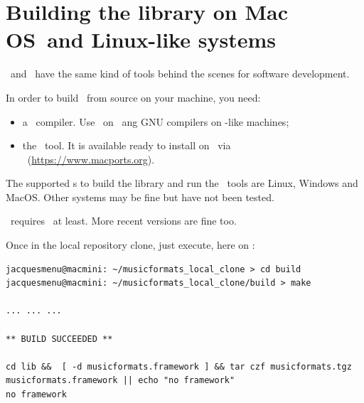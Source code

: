 \section{Building the library on Mac OS\texttrademark\ and Linux-like systems}

\MacOS\ and \Linux\ have the same kind of tools behind the scenes for software development.

In order to build \mf\ from source on your machine, you need:
\begin{itemize}
\item a \CPlusplus\ compiler. Use \xcode\ on \MacOS\ ang GNU compilers on \Unix -like machines;
\item the \cmake\ tool. It is available ready to install on \MacOS\ via \macports\ (\url{https://www.macports.org}).
\end{itemize}

The supported \OS s to build the library and run the \CLI\ tools are Linux, Windows and MacOS. Other systems may be fine but have not been tested.

\mf\ requires \CPlusplus\ at least. More recent versions are fine too.

Once in the local repository clone, just execute, here on \MacOS:
\begin{lstlisting}[language=Terminal]
jacquesmenu@macmini: ~/musicformats_local_clone > cd build
jacquesmenu@macmini: ~/musicformats_local_clone/build > make

... ... ...

** BUILD SUCCEEDED **

cd lib &&  [ -d musicformats.framework ] && tar czf musicformats.tgz musicformats.framework || echo "no framework"
no framework
\end{lstlisting}

